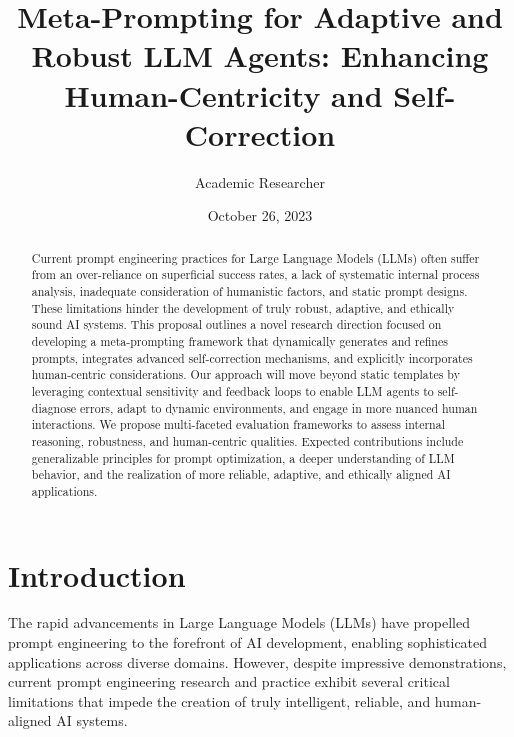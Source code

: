 \documentclass{article}
\begin{document}
\title{Meta-Prompting for Adaptive and Robust LLM Agents: Enhancing Human-Centricity and Self-Correction}
\author{Academic Researcher}
\date{October 26, 2023} 

\maketitle

\begin{abstract}
Current prompt engineering practices for Large Language Models (LLMs) often suffer from an over-reliance on superficial success rates, a lack of systematic internal process analysis, inadequate consideration of humanistic factors, and static prompt designs. These limitations hinder the development of truly robust, adaptive, and ethically sound AI systems. This proposal outlines a novel research direction focused on developing a meta-prompting framework that dynamically generates and refines prompts, integrates advanced self-correction mechanisms, and explicitly incorporates human-centric considerations. Our approach will move beyond static templates by leveraging contextual sensitivity and feedback loops to enable LLM agents to self-diagnose errors, adapt to dynamic environments, and engage in more nuanced human interactions. We propose multi-faceted evaluation frameworks to assess internal reasoning, robustness, and human-centric qualities. Expected contributions include generalizable principles for prompt optimization, a deeper understanding of LLM behavior, and the realization of more reliable, adaptive, and ethically aligned AI applications.
\end{abstract}

\section{Introduction}
The rapid advancements in Large Language Models (LLMs) have propelled prompt engineering to the forefront of AI development, enabling sophisticated applications across diverse domains. However, despite impressive demonstrations, current prompt engineering research and practice exhibit several critical limitations that impede the creation of truly intelligent, reliable, and human-aligned AI systems.
\end{document}
